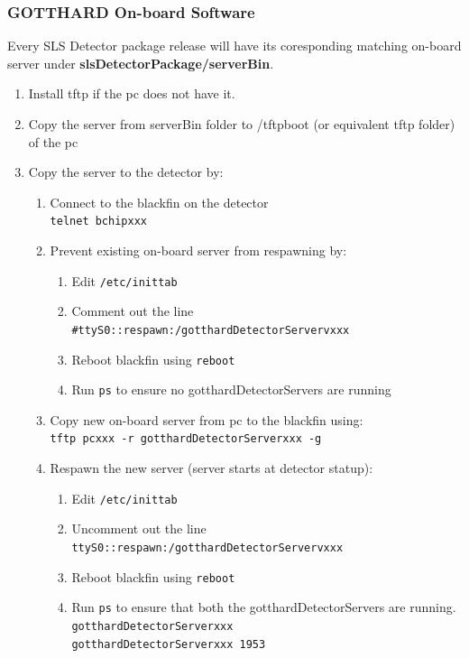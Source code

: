 \documentclass{article}
\begin{document}
\subsubsection{GOTTHARD On-board Software}
Every SLS Detector package release will have its coresponding matching on-board
server under \textbf{slsDetectorPackage/serverBin}.

\begin{enumerate}
  \item Install tftp if the pc does not have it.
  \item Copy the server from serverBin folder to /tftpboot (or equivalent tftp
folder) of the pc
  \item Copy the server to the detector by:
  \begin{enumerate}
    \item Connect to the blackfin on the detector\\ 
\verb=telnet bchipxxx=
    \item Prevent existing on-board server from respawning by:
    \begin{enumerate}
      \item Edit \verb=/etc/inittab= 
      \item Comment out the line
\verb=#ttyS0::respawn:/gotthardDetectorServervxxx= 
      \item Reboot blackfin using \verb=reboot=
      \item Run \verb=ps= to ensure no gotthardDetectorServers are running
    \end{enumerate}
    \item Copy new on-board server from pc to the blackfin using: \\
\verb=tftp pcxxx -r gotthardDetectorServerxxx -g= 
    \item Respawn the new server (server starts at detector statup): 
    \begin{enumerate}
      \item Edit \verb=/etc/inittab= 
      \item Uncomment out the line
\verb=ttyS0::respawn:/gotthardDetectorServervxxx= 
      \item Reboot blackfin using \verb=reboot=
      \item Run \verb=ps= to ensure that both the gotthardDetectorServers are
running.\\
\verb=gotthardDetectorServerxxx= \\
\verb=gotthardDetectorServerxxx 1953=
    \end{enumerate}
  \end{enumerate}
\end{enumerate}
\end{document}
